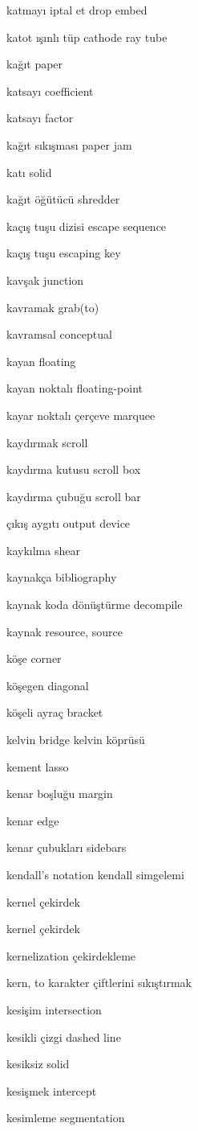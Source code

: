 \documentclass[12pt,fleqn]{article}\usepackage{../../common}
\begin{document}
katmayı iptal et drop embed

katot ışınlı tüp cathode ray tube

kağıt paper

katsayı coefficient

katsayı factor

kağıt sıkışması paper jam

katı solid

kağıt öğütücü shredder

kaçış tuşu dizisi escape sequence

kaçış tuşu escaping key

kavşak junction

kavramak grab(to)

kavramsal conceptual

kayan floating

kayan noktalı floating-point

kayar noktalı çerçeve marquee

kaydırmak scroll

kaydırma kutusu scroll box

kaydırma çubuğu scroll bar

çıkış aygıtı output device

kaykılma shear

kaynakça bibliography

kaynak koda dönüştürme decompile

kaynak resource, source

köşe corner

köşegen diagonal

köşeli ayraç bracket

kelvin bridge kelvin köprüsü

kement lasso

kenar boşluğu margin

kenar edge

kenar çubukları sidebars

kendall's notation kendall simgelemi

kernel çekirdek

kernel çekirdek

kernelization çekirdekleme

kern, to karakter çiftlerini sıkıştırmak

kesişim intersection

kesikli çizgi dashed line

kesiksiz solid

kesişmek intercept

kesimleme segmentation
\end{document}
